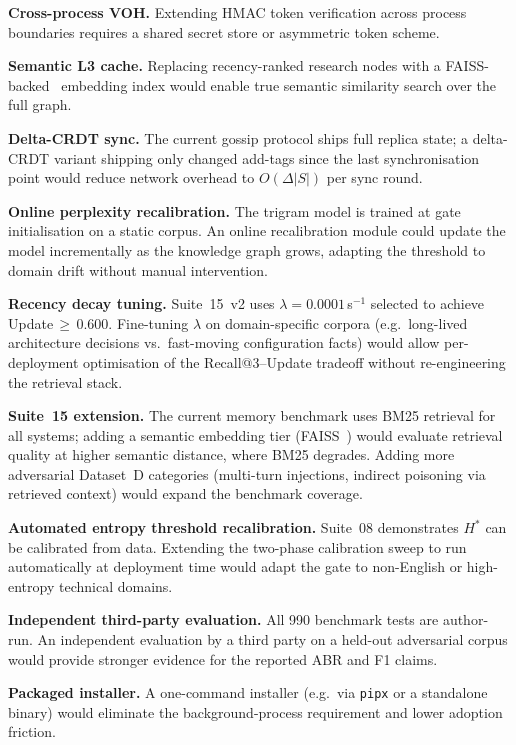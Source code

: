 \documentclass[11pt,twocolumn]{article}
\begin{document}
\textbf{Cross-process VOH.}
Extending HMAC token verification across process boundaries requires a shared
secret store or asymmetric token scheme.

\textbf{Semantic L3 cache.}
Replacing recency-ranked research nodes with a FAISS-backed~\cite{johnson2021faiss}
embedding index would enable true semantic similarity search over the full graph.

\textbf{Delta-CRDT sync.}
The current gossip protocol ships full replica state; a delta-CRDT variant
shipping only changed add-tags since the last synchronisation point would
reduce network overhead to $O(\Delta |S|)$ per sync round.

\textbf{Online perplexity recalibration.}
The trigram model is trained at gate initialisation on a static corpus.
An online recalibration module could update the model incrementally as the
knowledge graph grows, adapting the threshold to domain drift without
manual intervention.

\textbf{Recency decay tuning.}
Suite~15~v2 uses $\lambda=0.0001$\,s$^{-1}$ selected to achieve Update\,$\geq$\,0.600.
Fine-tuning $\lambda$ on domain-specific corpora (e.g.\ long-lived architecture
decisions vs.\ fast-moving configuration facts) would allow per-deployment
optimisation of the Recall@3--Update tradeoff without re-engineering the
retrieval stack.

\textbf{Suite~15 extension.}
The current memory benchmark uses BM25 retrieval for all systems; adding
a semantic embedding tier (FAISS~\cite{johnson2021faiss}) would evaluate
retrieval quality at higher semantic distance, where BM25 degrades.
Adding more adversarial Dataset~D categories (multi-turn injections,
indirect poisoning via retrieved context) would expand the benchmark coverage.

\textbf{Automated entropy threshold recalibration.}
Suite~08 demonstrates $H^{*}$ can be calibrated from data. Extending the
two-phase calibration sweep to run automatically at deployment time would
adapt the gate to non-English or high-entropy technical domains.

\textbf{Independent third-party evaluation.}
All 990 benchmark tests are author-run. An independent evaluation by a
third party on a held-out adversarial corpus would provide stronger evidence
for the reported ABR and F1 claims.

\textbf{Packaged installer.}
A one-command installer (e.g.\ via \texttt{pipx} or a standalone binary)
would eliminate the background-process requirement and lower adoption friction.
\end{document}
